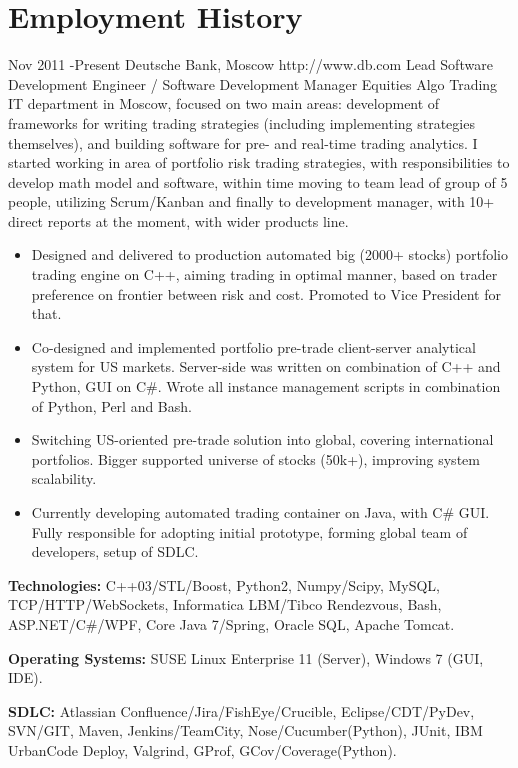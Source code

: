 \documentclass[10pt]{article} %
\begin{document}

\section{Employment History}

\job
{Nov 2011 -}{Present}
{Deutsche Bank, Moscow}
{http://www.db.com}
{Lead Software Development Engineer / Software Development Manager}
{Equities Algo Trading IT department in Moscow, focused on two main areas: development of frameworks for
writing trading strategies (including implementing strategies themselves), and building software 
for pre- and real-time  trading analytics. I started working in area of portfolio risk trading strategies,
with responsibilities to develop math model and software, within time moving to team lead of group of 5 people,
utilizing Scrum/Kanban and finally to development manager, with 10+ direct reports at the moment,
with wider products line.}
{\begin{itemize}
\item{Designed and delivered to production automated big (2000+ stocks) portfolio trading engine on C++,
aiming trading in optimal manner, based on trader preference on frontier between risk and cost. 
Promoted to Vice President for that.}
\item{Co-designed and implemented portfolio pre-trade client-server analytical system for US markets.
Server-side was written on combination of C++ and Python, GUI on C\#. Wrote all instance management scripts
in combination of Python, Perl and Bash.}
\item{Switching US-oriented pre-trade solution into global, covering international portfolios.
Bigger supported universe of stocks (50k+), improving system scalability.}
\item{Currently developing automated trading container on Java, with C\# GUI. Fully responsible for
adopting initial prototype, forming global team of developers, setup of SDLC.}
\end{itemize}}
{\rule{0mm}{5mm}\textbf{Technologies:} C++03/STL/Boost, Python2, Numpy/Scipy, MySQL, TCP/HTTP/WebSockets,
Informatica LBM/Tibco Rendezvous, Bash, ASP.NET/C\#/WPF, Core Java 7/Spring, Oracle SQL, Apache Tomcat.\\
\rule{0mm}{5mm}\textbf{Operating Systems:} SUSE Linux Enterprise 11 (Server), Windows 7 (GUI, IDE).\\
\rule{0mm}{5mm}\textbf{SDLC:} Atlassian Confluence/Jira/FishEye/Crucible, Eclipse/CDT/PyDev, SVN/GIT,
Maven, Jenkins/TeamCity, Nose/Cucumber(Python), JUnit, IBM UrbanCode Deploy, Valgrind, GProf, GCov/Coverage(Python).
}
\end{document}
